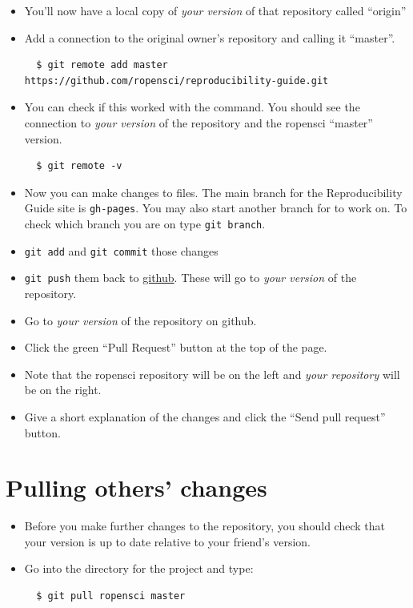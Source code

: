 \documentclass[
]{book}
\theoremstyle{definition}
\theoremstyle{definition}
\theoremstyle{definition}
\theoremstyle{definition}
\theoremstyle{remark}
\begin{document}
\begin{itemize}
\item
  You'll now have a local copy of \emph{your version} of that repository called ``origin''
\item
  Add a connection to the original owner's repository and calling it ``master''.

\begin{verbatim}
  $ git remote add master https://github.com/ropensci/reproducibility-guide.git
\end{verbatim}
\item
  You can check if this worked with the command. You should see the connection to \emph{your version} of the repository and the ropensci ``master''
  version.

\begin{verbatim}
  $ git remote -v
\end{verbatim}
\item
  Now you can make changes to files. The main branch for the Reproducibility Guide site is \texttt{gh-pages}. You may also start another branch for to work on. To check which branch you are on type \texttt{git\ branch}.
\item
  \texttt{git\ add} and \texttt{git\ commit} those changes
\item
  \texttt{git\ push} them back to \href{http://github.com}{github}. These will go
  to \emph{your version} of the repository.
\item
  Go to \emph{your version} of the repository on github.
\item
  Click the green ``Pull Request'' button at the top of the page.
\item
  Note that the ropensci repository will be on the left and \emph{your repository} will be on the right.
\item
  Give a short explanation of the changes and click the ``Send pull request'' button.
\end{itemize}

\hypertarget{pulling-others-changes}{%
\section{Pulling others' changes}\label{pulling-others-changes}}

\begin{itemize}
\item
  Before you make further changes to the repository, you should check that your version is up to date relative to your friend's version.
\item
  Go into the directory for the project and type:

\begin{verbatim}
  $ git pull ropensci master
\end{verbatim}
\end{itemize}
\end{document}
